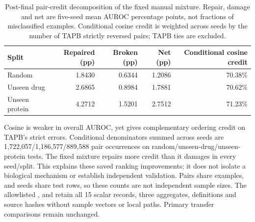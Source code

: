 \begin{table}[htbp]
\centering\small
\begin{tabular}{lrrrr}
\toprule
Split & Repaired (pp) & Broken (pp) & Net (pp) & Conditional cosine credit \\
\midrule
Random & 1.8430 & 0.6344 & 1.2086 & 70.38\% \\
Unseen drug & 2.6865 & 0.8984 & 1.7881 & 70.62\% \\
Unseen protein & 4.2712 & 1.5201 & 2.7512 & 71.23\% \\
\bottomrule
\end{tabular}
\caption{Post-final pair-credit decomposition of the fixed manual mixture. Repair, damage and net are five-seed mean AUROC percentage points, not fractions of misclassified examples. Conditional cosine credit is weighted across seeds by the number of TAPB strictly reversed pairs; TAPB ties are excluded.}
\label{tab:tapb-pair-credit}
\end{table}

Cosine is weaker in overall AUROC, yet gives complementary ordering credit on TAPB's strict errors. Conditional denominators summed across seeds are 1,722,057/1,186,577/889,588 pair occurrences on random/unseen-drug/unseen-protein tests. The fixed mixture repairs more credit than it damages in every seed/split. This explains these saved ranking improvements; it does not isolate a biological mechanism or establish independent validation. Pairs share examples, and seeds share test rows, so these counts are not independent sample sizes. The allowlisted ,  and  retain all 15 scalar records, three aggregates, definitions and source hashes without sample vectors or local paths. Primary transfer comparisons remain unchanged.
